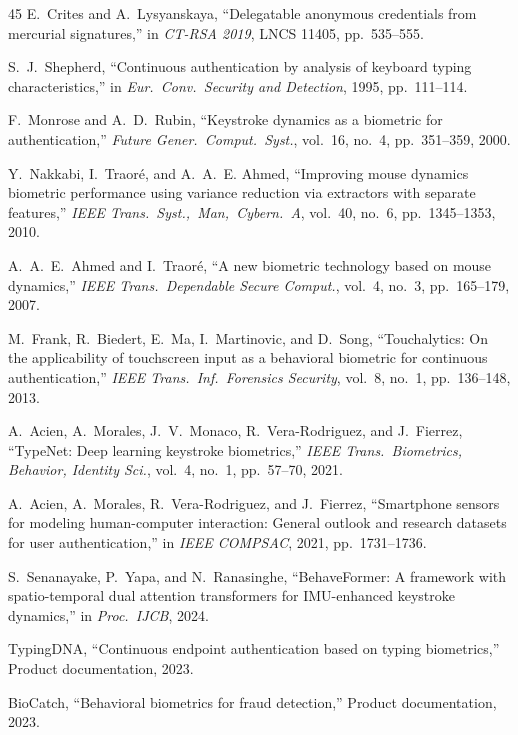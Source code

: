 \documentclass[journal,twoside,10pt]{IEEEtran}
\begin{document}
\begin{thebibliography}{45}
E.~Crites and A.~Lysyanskaya, ``Delegatable anonymous credentials from
mercurial signatures,'' in \emph{CT-RSA 2019}, LNCS 11405, pp.~535--555.

S.~J.~Shepherd, ``Continuous authentication by analysis of keyboard typing
characteristics,'' in \emph{Eur.\ Conv.\ Security and Detection}, 1995,
pp.~111--114.

F.~Monrose and A.~D.~Rubin, ``Keystroke dynamics as a biometric for
authentication,'' \emph{Future Gener.\ Comput.\ Syst.}, vol.~16, no.~4,
pp.~351--359, 2000.

Y.~Nakkabi, I.~Traor{\'e}, and A.~A.~E. Ahmed, ``Improving mouse dynamics
biometric performance using variance reduction via extractors with separate
features,'' \emph{IEEE Trans.\ Syst.,\ Man,\ Cybern.\ A}, vol.~40, no.~6,
pp.~1345--1353, 2010.

A.~A.~E.~Ahmed and I.~Traor{\'e}, ``A new biometric technology based on
mouse dynamics,'' \emph{IEEE Trans.\ Dependable Secure Comput.}, vol.~4,
no.~3, pp.~165--179, 2007.

M.~Frank, R.~Biedert, E.~Ma, I.~Martinovic, and D.~Song, ``Touchalytics:
On the applicability of touchscreen input as a behavioral biometric for
continuous authentication,'' \emph{IEEE Trans.\ Inf.\ Forensics Security},
vol.~8, no.~1, pp.~136--148, 2013.

A.~Acien, A.~Morales, J.~V.~Monaco, R.~Vera-Rodriguez, and J.~Fierrez,
``TypeNet: Deep learning keystroke biometrics,''
\emph{IEEE Trans.\ Biometrics, Behavior, Identity Sci.}, vol.~4, no.~1,
pp.~57--70, 2021.

A.~Acien, A.~Morales, R.~Vera-Rodriguez, and J.~Fierrez, ``Smartphone
sensors for modeling human-computer interaction: General outlook and
research datasets for user authentication,'' in \emph{IEEE COMPSAC}, 2021,
pp.~1731--1736.

S.~Senanayake, P.~Yapa, and N.~Ranasinghe, ``BehaveFormer: A framework with
spatio-temporal dual attention transformers for IMU-enhanced keystroke
dynamics,'' in \emph{Proc.\ IJCB}, 2024.

TypingDNA, ``Continuous endpoint authentication based on typing
biometrics,'' Product documentation, 2023.

BioCatch, ``Behavioral biometrics for fraud detection,'' Product
documentation, 2023.


\end{thebibliography}
\end{document}
